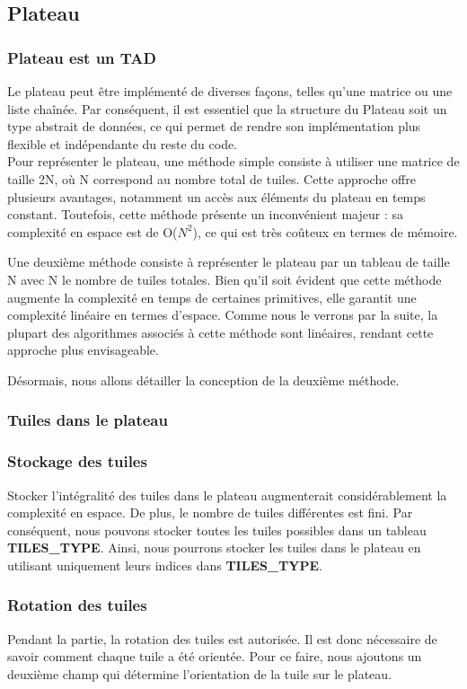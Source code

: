 \subsection{Plateau}
\subsubsection{Plateau est un TAD }
Le plateau peut être implémenté de diverses façons, telles qu'une matrice ou une liste chaînée. Par conséquent, il est essentiel que la structure du Plateau soit un type abstrait de données, ce qui permet de rendre son implémentation plus flexible et indépendante du reste du code. \\
Pour représenter le plateau, une méthode simple consiste à utiliser une matrice de taille 2N, où N correspond au nombre total de tuiles. Cette approche offre plusieurs avantages, notamment un accès aux éléments du plateau en temps constant. Toutefois, cette méthode présente un inconvénient majeur : sa complexité en espace est de O($N^2$), ce qui est très coûteux en termes de mémoire.

Une deuxième méthode consiste à représenter le plateau par un tableau de taille N avec N le nombre de tuiles totales. Bien qu'il soit évident que cette méthode augmente la complexité en temps de certaines primitives, elle garantit une complexité linéaire en termes d'espace. Comme nous le verrons par la suite, la plupart des algorithmes associés à cette méthode sont linéaires, rendant cette approche plus envisageable.

Désormais, nous allons détailler la conception de la deuxième méthode.
\subsubsection{Tuiles dans le plateau}
\subsubsection*{Stockage des tuiles}
Stocker l'intégralité des tuiles dans le plateau augmenterait considérablement la complexité en espace. De plus, le nombre de tuiles différentes est fini. Par conséquent, nous pouvons stocker toutes les tuiles possibles dans un tableau \textbf{TILES\_TYPE}. Ainsi, nous pourrons stocker les tuiles dans le plateau en utilisant uniquement leurs indices dans \textbf{TILES\_TYPE}.
\subsubsection*{Rotation des tuiles}
Pendant la partie, la rotation des tuiles est autorisée. Il est donc nécessaire de savoir comment chaque tuile a été orientée. Pour ce faire, nous ajoutons un deuxième champ qui détermine l'orientation de la tuile sur le plateau.
